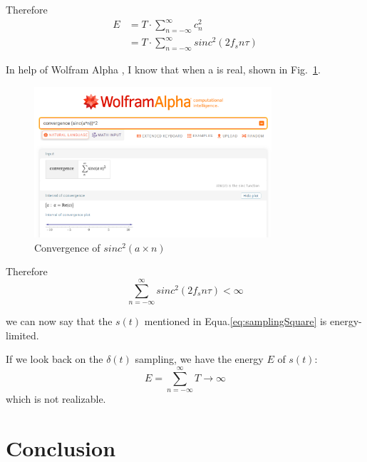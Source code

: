 \documentclass{article}
\begin{document}

Therefore
\begin{equation*}
\begin{aligned}
E &= T \cdot \sum_{n = -\infty}^{\infty} c_n^2 \\ 
&= T \cdot \sum_{n = -\infty}^{\infty} sinc^2(2f_sn\tau)
\end{aligned}
\end{equation*}

\newpage

In help of Wolfram Alpha \cite{sinc_convergence}, I know that when a is real, shown in Fig.~\ref{fig:sinc_convergence}.

\begin{figure}[htbp]
    \centering
    \includegraphics[keepaspectratio,width=250pt]{../pic/sinc_convergence.png}
    \caption{Convergence of $sinc^2(a\times n)$}
    \label{fig:sinc_convergence}
\end{figure}

Therefore
\begin{equation}
\sum_{n = -\infty}^{\infty} sinc^2(2f_sn\tau) < \infty
\end{equation}

we can now say that the $s(t)$ mentioned in Equa.\ref{eq:samplingSquare} is energy-limited.

If we look back on the $\delta(t)$ sampling, we have the energy $E$ of $s(t)$:
\begin{equation}
E = \sum_{n = -\infty}^{\infty} T \to \infty
\end{equation}
which is not realizable.

\section{Conclusion}
\end{document}
